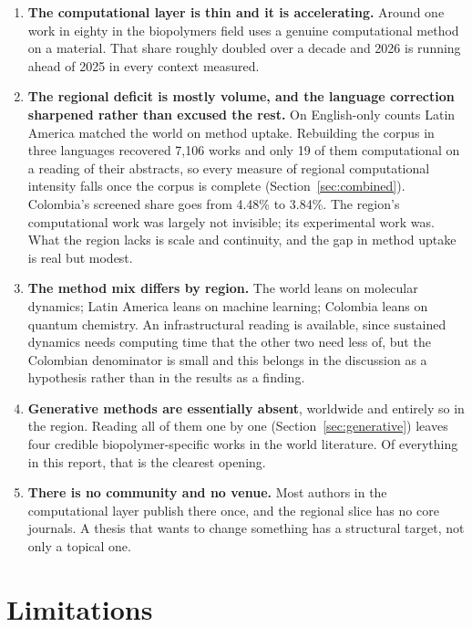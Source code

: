\documentclass[11pt,a4paper]{article}
\begin{document}
\begin{enumerate}
\item \textbf{The computational layer is thin and it is accelerating.} Around one work in
      eighty in the biopolymers field uses a genuine computational method on a material.
      That share roughly doubled over a decade and 2026 is running ahead of 2025 in every
      context measured.
\item \textbf{The regional deficit is mostly volume, and the language correction sharpened
      rather than excused the rest.} On English-only counts Latin America matched the world
      on method uptake. Rebuilding the corpus in three languages recovered 7{,}106 works and
      only 19 of them computational on a reading of their abstracts, so every measure of
      regional computational intensity falls once the corpus is complete
      (Section~\ref{sec:combined}). Colombia's screened share goes from 4.48\% to 3.84\%.
      The region's computational work was largely not invisible; its experimental work was.
      What the region lacks is scale and continuity, and the gap in method uptake is real
      but modest.
\item \textbf{The method mix differs by region.} The world leans on molecular dynamics;
      Latin America leans on machine learning; Colombia leans on quantum chemistry. An
      infrastructural reading is available, since sustained dynamics needs computing time
      that the other two need less of, but the Colombian denominator is small and this
      belongs in the discussion as a hypothesis rather than in the results as a finding.
\item \textbf{Generative methods are essentially absent}, worldwide and entirely so in the
      region. Reading all of them one by one (Section~\ref{sec:generative}) leaves four
      credible biopolymer-specific works in the world literature. Of everything in this
      report, that is the clearest opening.
\item \textbf{There is no community and no venue.} Most authors in the computational layer
      publish there once, and the regional slice has no core journals. A thesis that wants
      to change something has a structural target, not only a topical one.
\end{enumerate}

\section{Limitations}
\end{document}
